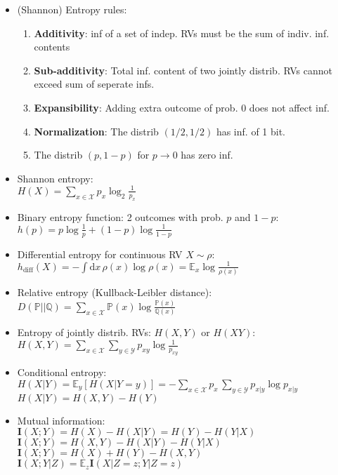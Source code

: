 \documentclass[twocolumn,9pt]{extarticle}
\begin{document}
\begin{itemize}
	\item (Shannon) Entropy rules:
		\begin{enumerate}
			\item \textbf{Additivity}: inf of a set of indep. RVs must be the sum of indiv. inf. contents 
			\item \textbf{Sub-additivity}: Total inf. content of two jointly distrib. RVs cannot exceed sum of seperate infs.
			\item \textbf{Expansibility}: Adding extra outcome of prob. 0 does not affect inf.
			\item \textbf{Normalization}: The distrib $(1/2,1/2)$ has inf. of 1 bit.
			\item The distrib $(p, 1-p)$ for $p \to 0$ has zero inf.
		\end{enumerate}

	\item Shannon entropy:\\
	$H(X) = \sum_{x \in \mathcal{X}} p_x \log_2 \frac{1}{p_x}$

	\item Binary entropy function: 2 outcomes with prob. $p$ and $1-p$: \\
	$h(p) = p \log \frac{1}{p} + (1 - p) \log \frac{1}{1-p}$

	\item Differential entropy for continuous RV $X \sim \rho$:\\
	$h_{\text{diff}}(X) = - \int \mathrm{d}x\, \rho(x) \log \rho(x) = \mathbb{E}_x \log \frac{1}{\rho(x)}$

	\item Relative entropy (Kullback-Leibler distance): \\
	$D(\mathbb{P}||\mathbb{Q}) = \sum_{x \in \mathcal{X}} \mathbb{P}(x) \log \frac{\mathbb{P}(x)}{\mathbb{Q}(x)}$

	\item Entropy of jointly distrib. RVs: $H(X,Y)$ or $H(XY)$: \\
	$H(X,Y) = \sum_{x \in \mathcal{X}} \sum_{y \in \mathcal{Y}} p_{xy} \log \frac{1}{p_{xy}}$

	\item Conditional entropy: \\
	$H(X|Y) = \mathbb{E}_y[H(X|Y = y)] = - \sum_{x \in \mathcal{X}} p_x\, \sum_{y \in \mathcal{Y}} p_{x|y} \log p_{x|y}$ \\
	$H(X|Y) = H(X,Y) - H(Y)$
	
	\item Mutual information: \\
	$\mathbf{I}(X;Y) = H(X) - H(X|Y) = H(Y) - H(Y|X)$\\
	$\mathbf{I}(X;Y) = H(X,Y) - H(X|Y) - H(Y|X)$\\
	$\mathbf{I}(X;Y) = H(X) + H(Y) - H(X,Y)$\\
	$\mathbf{I}(X;Y|Z) = \mathbb{E}_z \mathbf{I}(X|Z=z ; Y|Z = z)$


\end{itemize}
\end{document}
